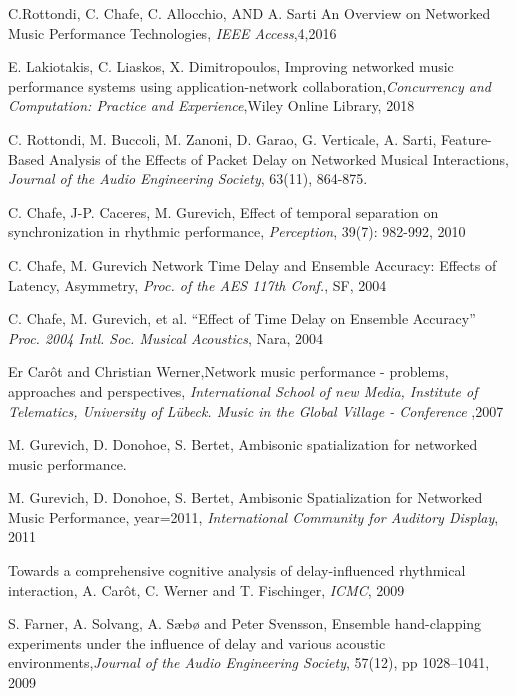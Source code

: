 C.Rottondi, C. Chafe, C. Allocchio, AND A. Sarti
An Overview on Networked Music Performance Technologies, \emph{IEEE Access},4,2016



E. Lakiotakis, C. Liaskos, X. Dimitropoulos, Improving networked music performance systems using application-network collaboration,\emph{Concurrency and Computation: Practice and Experience},Wiley Online Library, 2018

C. Rottondi, M. Buccoli, M. Zanoni, D. Garao,  G. Verticale, A. Sarti,  Feature-Based Analysis of the Effects of Packet Delay on Networked Musical Interactions, \emph{Journal of the Audio Engineering Society}, 63(11), 864-875.



C. Chafe, J-P. Caceres, M. Gurevich, Effect of temporal separation on synchronization in rhythmic performance,
\emph{Perception}, 39(7): 982-992, 2010

C. Chafe, M. Gurevich Network Time Delay and Ensemble Accuracy: Effects of Latency, Asymmetry,
\emph{Proc. of the AES 117th Conf.}, SF, 2004

C. Chafe, M. Gurevich, et al. “Effect of Time Delay on Ensemble Accuracy”
\emph{Proc. 2004 Intl. Soc. Musical Acoustics}, Nara, 2004



Er Car\^ot and Christian Werner,Network music performance - problems, approaches and perspectives,
    \emph{International School of new Media, Institute of Telematics, University of Lübeck. Music in the Global Village - Conference}
    ,2007

M. Gurevich, D. Donohoe, S. Bertet, Ambisonic spatialization for networked music performance.


M. Gurevich, D. Donohoe, S. Bertet,
  Ambisonic Spatialization for Networked Music Performance,
  year={2011},
  \emph{International Community for Auditory Display}, 2011

 Towards a comprehensive cognitive analysis of delay-influenced rhythmical interaction,
  A. Car{\^o}t, C. Werner and T. Fischinger,
  \emph{ICMC},
  2009

S. Farner, A. Solvang, A. Sæbø and Peter Svensson, Ensemble hand-clapping experiments under
the influence of delay and various acoustic
environments,\emph{Journal of the Audio Engineering Society}, 57(12),
  pp 1028--1041, 2009



